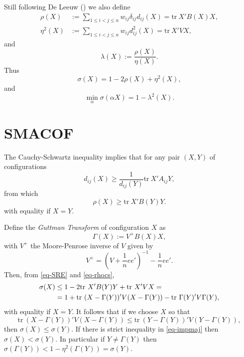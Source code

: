 \documentclass[
  12pt,
  letterpaper,
  DIV=11,
  numbers=noendperiod]{scrartcl}
\newcommand{\sectionbreak}{\clearpage}
\begin{document}
Still following De Leeuw () we also
define \begin{align}
\rho(X)&:=\mathop{\sum}_{1\leq i<j\leq n} w_{ij}\delta_{ij}d_{ij}(X)=\text{tr}\ X'B(X)X,\label{eq-rhodef}\\
\eta^2(X)&:=\mathop{\sum}_{1\leq i<j\leq n} w_{ij}d_{ij}^2(X)=\text{tr}\ X'VX,\label{eq-etadef}
\end{align} and \begin{equation}
\lambda(X):=\frac{\rho(X)}{\eta(X)}.\label{eq-lbddef}
\end{equation} Thus \begin{equation}
\sigma(X)=1-2\rho(X)+\eta^2(X),
\label{eq-SRE}
\end{equation} and \begin{equation}
\min_{\alpha}\sigma(\alpha X)=1-\lambda^2(X).
\label{eq-lstress}
\end{equation}

\sectionbreak

\section{SMACOF}\label{smacof}

The Cauchy-Schwartz inequality implies that for any pair \((X,Y)\) of
configurations \begin{equation}
d_{ij}(X)\geq\frac{1}{d_{ij}(Y)}\text{tr}\ X'A_{ij}Y,\label{eq-distcs}
\end{equation} from which \begin{equation}
\rho(X)\geq\text{tr}\ X'B(Y)Y.\label{eq-rhocs}
\end{equation} with equality if \(X=Y\).

Define the \emph{Guttman Transform} of configuration \(X\) as
\begin{equation}
\Gamma(X):=V^+B(X)X,
\label{eq-guttmanx}
\end{equation} with \(V^+\) the Moore-Penrose inverse of \(V\) given by
\begin{equation}
V^+=(V+\frac{1}{n}ee')^{-1}-\frac{1}{n}ee'.\label{eq-vinv}
\end{equation} Then, from \eqref{eq-SRE} and \eqref{eq-rhocs},
\begin{align}
  \sigma(X)&\leq 1-2\text{tr}\ X'B(Y)Y+\text{tr}\ X'VX=\notag\\
  &=1+\text{tr}\ (X-\Gamma(Y))'V(X-\Gamma(Y))
  -\text{tr}\ \Gamma(Y)'V\Gamma(Y),\label{eq-stressmaj}
\end{align} with equality if \(X=Y\). It follows that if we choose \(X\)
so that \begin{equation}
\text{tr}\ (X-\Gamma(Y))'V(X-\Gamma(Y))\leq\text{tr}\ (Y-\Gamma(Y))'V(Y-\Gamma(Y)),\label{eq-impmaj}
\end{equation} then \(\sigma(X)\leq\sigma(Y)\). If there is strict
inequality in \eqref{eq-impmaj} then \(\sigma(X)<\sigma(Y)\). In
particular if \(Y\neq\Gamma(Y)\) then
\(\sigma(\Gamma(Y))<1-\eta^2(\Gamma(Y))=\sigma(Y)\).
\end{document}
